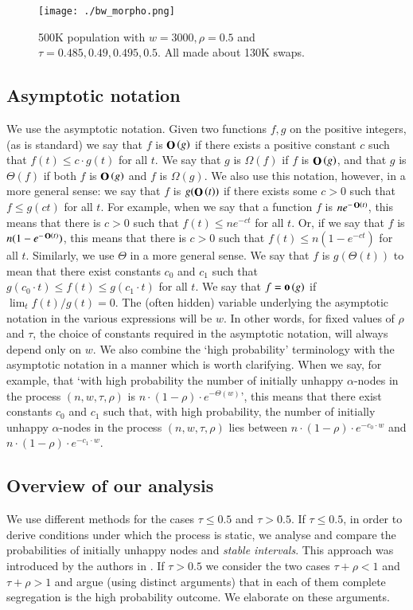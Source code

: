 \documentclass[11pt]{article}
\theoremstyle{plain}
\numberwithin{equation}{subsection}
\newcommand{\bigo}[1]{\mathop{\bf O}\/\left({#1}\right)}
\newcommand{\smo}[1]{\mathop{\bf o}\/\left({#1}\right)}
\begin{document}
\begin{figure} 
\centering\texttt{[image: ./bw\_morpho.png]}
\caption{500K population with $w=3000, \rho=0.5$ and $\tau=0.485, 0.49, 0.495, 0.5$. All made about 130K swaps.}
\label{fig:ciclmorphostatlides}
\end{figure}  

\subsection{Asymptotic notation}
 We use the asymptotic notation. 
Given two functions $f,g$ on the positive integers, (as is standard) we say that 
$f$ is $\bigo{g}$ if there exists a positive constant 
$c$ such that $f(t)\leq c\cdot g(t)$ for all $t$.
We say that  $g$ is $\Omega(f)$ if $f$ is $\bigo{g}$, and that $g$ is $\Theta(f)$ if both
$f$ is $\bigo{g}$ and $f$ is $\Omega(g)$.
We also use this notation, however,  in a more general sense: we say that $f$ is $g(\bigo{t})$
if there exists some $c>0$ such that $f\leq g(ct)$ for all $t$. For example, when we  say that
a function $f$ is $ne^{-\bigo{t}}$, this means that  there is $c>0$ such that $f(t)\leq ne^{-ct}$
for all $t$.  Or, if we say that $f$ is $n(1-e^{-\bigo{t}})$, this means that  there is $c>0$ such that $f(t)\leq n(1-e^{-ct})$
for all $t$.
Similarly, we use $\Theta$ in a more general sense. 
We say that $f$ is $g(\Theta(t))$ to mean that there exist constants $c_0$ and $c_1$ such that $ g(c_0\cdot t) \leq  f(t)  \leq g(c_1 \cdot t)$ for all $t$. 
We say that $f=\smo{g}$ if $\lim_t f(t)/g(t)=0$.
The (often hidden) variable underlying the asymptotic
notation in the various expressions will be $w$. 
In other words, for fixed values of $\rho$ and $\tau$, 
the choice of constants required in the asymptotic notation, will always depend only on $w$.  
We also combine the `high probability' terminology with the 
asymptotic notation in a manner which is worth clarifying. When we say, for example, that 
`with high probability 
 the number of initially unhappy $\alpha$-nodes in the process  
$(n,w,\tau,\rho)$ is 
$n\cdot (1-\rho)\cdot  e^{-\Theta(w)}$', this means that there exist constants 
$c_0$ and $c_1$ such that, with high probability,  the number of initially unhappy $\alpha$-nodes in the process  
$(n,w,\tau,\rho)$ lies  between 
$n\cdot (1-\rho)\cdot  e^{-c_0 \cdot w}$ and $n\cdot (1-\rho)\cdot  e^{-c_1 \cdot w}$.


\subsection{Overview of our analysis}
We use different methods for the cases $\tau\leq 0.5$ and $\tau>0.5$.
If $\tau\leq 0.5$, in order to derive conditions under which the process is static, we
analyse and compare the probabilities of initially unhappy nodes
and  {\em stable intervals}. This approach was introduced
by the authors in 
\cite{BELschel13}. If $\tau>0.5$ we consider the two cases $\tau +\rho<1$ and 
$\tau +\rho>1$ and argue (using distinct arguments) that in each of them complete
segregation is the high probability outcome. We elaborate on these arguments.
\end{document}
